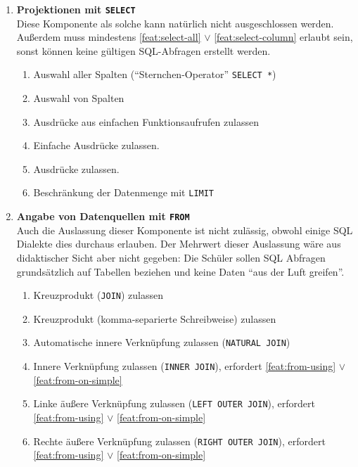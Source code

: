 \begin{enumerate}
\item \textbf{Projektionen mit \texttt{SELECT}} \\
  Diese Komponente als solche kann natürlich nicht ausgeschlossen werden. Außerdem muss mindestens \ref{feat:select-all} $\lor$ \ref{feat:select-column} erlaubt sein, sonst können keine gültigen SQL-Abfragen erstellt werden.
  \begin{enumerate}
  \item \label{feat:select-all} Auswahl aller Spalten (``Sternchen-Operator'' \texttt{SELECT *})
  \item \label{feat:select-column} Auswahl von Spalten
  \item \label{feat:select-single-function} Ausdrücke aus einfachen Funktionsaufrufen zulassen
  \item \label{feat:select-simple-expression} Einfache Ausdrücke zulassen.
  \item \label{feat:select-expression} Ausdrücke zulassen.
  \item \label{feat:select-limit} Beschränkung der Datenmenge mit \texttt{LIMIT}
  \end{enumerate}
\item \textbf{Angabe von Datenquellen mit \texttt{FROM}} \\
  Auch die Auslassung dieser Komponente ist nicht zulässig, obwohl einige SQL Dialekte dies durchaus erlauben. Der Mehrwert dieser Auslassung wäre aus didaktischer Sicht aber nicht gegeben: Die Schüler sollen SQL Abfragen grundsätzlich auf Tabellen beziehen und keine Daten ``aus der Luft greifen''.
  \begin{enumerate}
  \item \label{feat:from-cross-join} Kreuzprodukt (\texttt{JOIN}) zulassen
  \item \label{feat:from-cross-comma} Kreuzprodukt (komma-separierte Schreibweise) zulassen
  \item \label{feat:from-natural-join} Automatische innere Verknüpfung zulassen (\texttt{NATURAL JOIN})
  \item \label{feat:from-inner-join} Innere Verknüpfung zulassen (\texttt{INNER JOIN}), erfordert \ref{feat:from-using} $\lor$ \ref{feat:from-on-simple}
  \item \label{feat:from-left-join} Linke äußere Verknüpfung zulassen (\texttt{LEFT OUTER JOIN}), erfordert \ref{feat:from-using} $\lor$ \ref{feat:from-on-simple}
  \item \label{feat:from-right-join} Rechte äußere Verknüpfung zulassen (\texttt{RIGHT OUTER JOIN}), erfordert \ref{feat:from-using} $\lor$ \ref{feat:from-on-simple}

\end{enumerate}
\end{enumerate}
